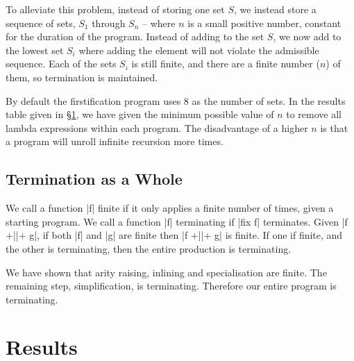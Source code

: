 \documentclass[preprint]{sigplanconf}
\begin{document}
To alleviate this problem, instead of storing one set $S$, we instead store a sequence of sets, $S_1$ through $S_n$ -- where $n$ is a small positive number, constant for the duration of the program. Instead of adding to the set $S$, we now add to the lowest set $S_i$ where adding the element will not violate the admissible sequence. Each of the sets $S_i$ is still finite, and there are a finite number ($n$) of them, so termination is maintained.

By default the firstification program uses 8 as the number of sets. In the results table given in \S\ref{sec:results}, we have given the minimum possible value of $n$ to remove all lambda expressions within each program. The disadvantage of a higher $n$ is that a program will unroll infinite recursion more times.

\subsection{Termination as a Whole}

We call a function |f| finite if it only applies a finite number of times, given a starting program. We call a function |f| terminating if |fix f| terminates. Given |f +||+ g|, if both |f| and |g| are finite then |f +||+ g| is finite. If one if finite, and the other is terminating, then the entire production is terminating.

We have shown that arity raising, inlining and specialisation are finite. The remaining step, simplification, is terminating. Therefore our entire program is terminating.

\section{Results}
\label{sec:results}
\end{document}
